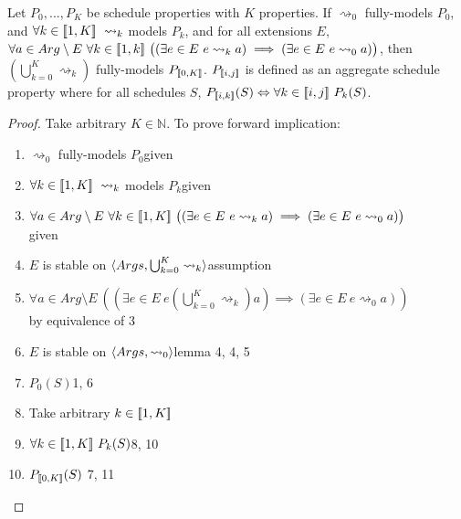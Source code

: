 \begin{theorem}
	Let $P_0,...,P_K$ be schedule properties with $K$ properties. If $\rightsquigarrow_0$ fully-models $P_0$, and $\forall k\in\intset{1,K}\ \rightsquigarrow_k$ models $P_k$, and for all extensions $E$, $\forall a\in Arg\setminus E\ \forall k\in[\![{1,k}]\!]\ \big((\exists e\in E\ e\rightsquigarrow_k a)\implies(\exists e\in E\ e\rightsquigarrow_0 a)\big)$, then $\left(\bigcup_{k=0}^K\rightsquigarrow_k\right)$ fully-models $P_{[\![{0,K}]\!]}$. $P_{[\![{i,j}]\!]}$ is defined as an aggregate schedule property where for all schedules $S$, $P_{[\![{i, k}]\!]}(S)\Leftrightarrow\forall k\in[\![{i,j}]\!]\ P_k(S)$.
	
	\begin{proof}
		Take arbitrary $K\in\mathbb{N}$. To prove forward implication:
		\begin{enumerate}
			\item$\rightsquigarrow_0$ fully-models $P_0$\hfill given
			\item$\forall k\in\intset{1,K}\ \rightsquigarrow_k$ models $P_k$\hfill given
			\item$\forall a\in Arg\setminus E\ \forall k\in[\![{1,K}]\!]\ \big((\exists e\in E\ e\rightsquigarrow_k a)\implies(\exists e\in E\ e\rightsquigarrow_0 a)\big)$\\\null\hfill given
			\item$E$ is stable on $\langle{Args},{\bigcup_{k=0}^K\rightsquigarrow_k}\rangle$\hfill assumption
			\item$\forall a\in Arg\setminus E\ \left(\left(\exists e\in E\ e\left(\bigcup_{k=0}^K\rightsquigarrow_k\right) a\right)\implies(\exists e\in E\ e\rightsquigarrow_0 a)\right)$\\\null\hfill by equivalence of 3
			\item$E$ is stable on $\langle{Args},{\rightsquigarrow_0}\rangle$\hfill lemma 4, 4, 5
			\item$P_0(S)$\hfill 1, 6
			\item Take arbitrary $k\in[\![{1,K}]\!]$
			\item$\forall k\in\intset{1,K}\ P_k(S)$\hfill 8, 10
			\item$P_{[\![{0,K}]\!]}(S)$ \hfill 7, 11
		\end{enumerate}
	

\end{proof}
\end{theorem}
